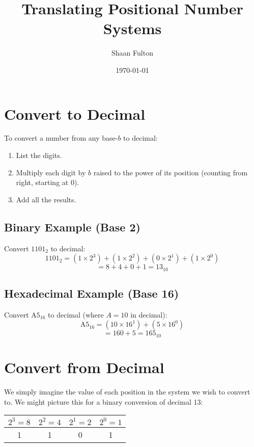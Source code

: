 \documentclass[12pt]{article}
\title{Translating Positional Number Systems}
\author{Shaan Fulton}
\date{\today}
\begin{document}
\maketitle

\section*{Convert to Decimal}

To convert a number from any base-$b$ to decimal:
\begin{enumerate}
    \item List the digits.
    \item Multiply each digit by $b$ raised to the power of its position (counting from right, starting at 0).
    \item Add all the results.
\end{enumerate}

\subsection*{Binary Example (Base 2)}

Convert \(1101_2\) to decimal:
\[
1101_2 = (1 \times 2^3) + (1 \times 2^2) + (0 \times 2^1) + (1 \times 2^0)
\]
\[
= 8 + 4 + 0 + 1 = 13_{10}
\]

\subsection*{Hexadecimal Example (Base 16)}

Convert \(\text{A5}_{16}\) to decimal (where $A = 10$ in decimal):
\[
\text{A5}_{16} = (10 \times 16^1) + (5 \times 16^0)
\]
\[
= 160 + 5 = 165_{10}
\]

\section*{Convert from Decimal}

We simply imagine the value of each position in the system we wish to convert to. We might picture this for a binary conversion of decimal 13:

\begin{center}
\begin{tabular}{|c|c|c|c|}
    \hline
    $2^3=8$ & $2^2=4$ & $2^1=2$ & $2^0=1$ \\
    \hline
    1 & 1 & 0 & 1 \\
    \hline
\end{tabular}
\end{center}
\end{document}

